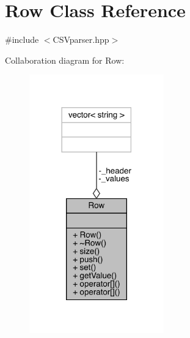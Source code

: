 \hypertarget{class_row}{}\section{Row Class Reference}
\label{class_row}


{\ttfamily \#include $<$C\+S\+Vparser.\+hpp$>$}



Collaboration diagram for Row\+:\nopagebreak
\begin{figure}[H]
\begin{center}
\leavevmode
\includegraphics[width=165pt]{class_row__coll__graph}
\end{center}
\end{figure}
